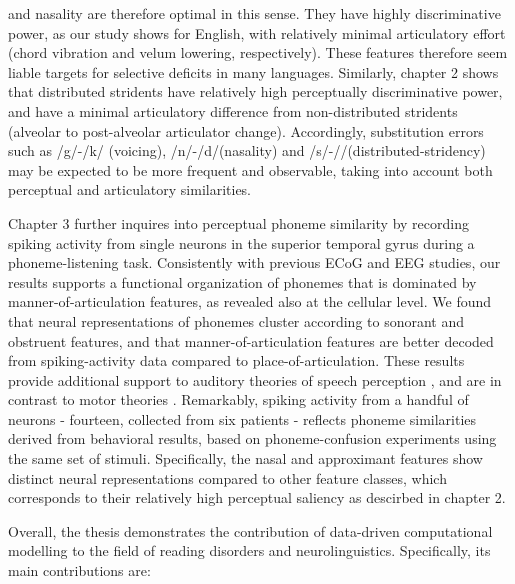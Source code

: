 and nasality are therefore optimal in this sense. They have highly discriminative power, as our study shows for English, with relatively minimal articulatory effort (chord vibration and velum lowering, respectively). These features therefore seem liable targets for selective deficits in many languages. Similarly, chapter 2 shows that distributed stridents have relatively high perceptually discriminative power, and have a minimal articulatory difference from non-distributed stridents (alveolar to post-alveolar articulator change). Accordingly, substitution errors such as /g/-/k/ (voicing), /n/-/d/(nasality) and /s/-//(distributed-stridency) may be expected to be more frequent and observable, taking into account both perceptual and articulatory similarities.

Chapter 3 further inquires into perceptual phoneme similarity by recording spiking activity from single neurons in the superior temporal gyrus during a phoneme-listening task. Consistently with previous ECoG and EEG studies, our results supports a functional organization of phonemes that is dominated by manner-of-articulation features, as revealed also at the cellular level. We found that neural representations of phonemes cluster according to sonorant and obstruent features, and that manner-of-articulation features are better decoded from spiking-activity data compared to place-of-articulation. These results provide additional support to auditory theories of speech perception \citep{stevens1989quantal, stevens2002toward}, and are in contrast to motor theories \citep{liberman1985motor, browman1992articulatory}. Remarkably, spiking activity from a handful of neurons - fourteen, collected from six patients - reflects phoneme similarities derived from behavioral results, based on phoneme-confusion experiments using the same set of stimuli. Specifically, the nasal and approximant features show distinct neural representations compared to other feature classes, which corresponds to their relatively high perceptual saliency as descirbed in chapter 2. 

Overall, the thesis demonstrates the contribution of data-driven computational modelling to the field of reading disorders and neurolinguistics. Specifically, its main contributions are:


